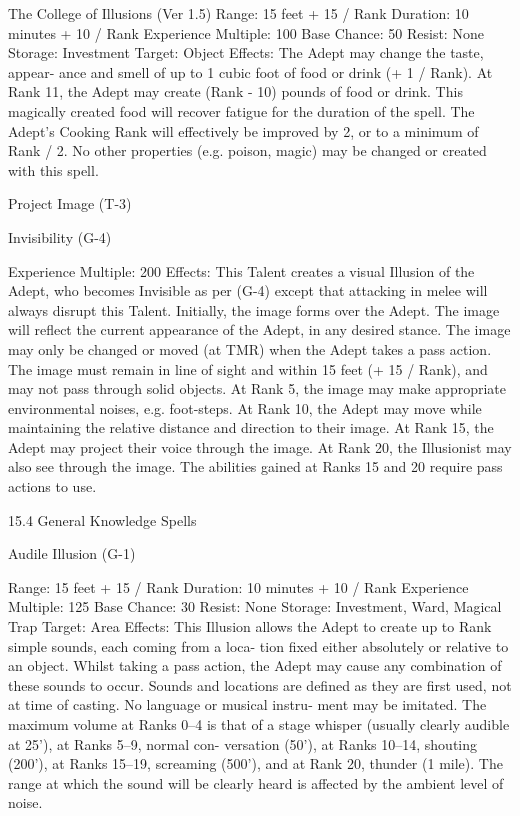 \begin{Chapter}{The College of Illusions (Ver 1.5)}
Range: 15 feet + 15 / Rank 
Duration: 10 minutes + 10 / Rank 
Experience Multiple: 100 
Base Chance: 50%
Resist: None 
Storage: Investment 
Target: Object 
Effects:  The  Adept  may  change  the  taste,  appear-
ance  and  smell  of  up  to  1  cubic  foot  of  food  or 
drink  (+  1  /  Rank).  At  Rank  11,  the  Adept  may 
create  (Rank  -  10)  pounds  of  food  or  drink.  This 
magically created food will recover fatigue for the 
duration  of  the  spell.  The  Adept’s  Cooking  Rank 
will effectively be improved by 2, or to a minimum 
of  Rank  /  2.  No  other  properties  (e.g.  poison, 
magic) may be changed or created with this spell. 

Project Image (T-3) 

Invisibility (G-4) 

Experience Multiple: 200 
Effects: This Talent creates a visual Illusion of the 
Adept, who becomes  Invisible as per (G-4) except 
that  attacking  in  melee  will  always  disrupt  this 
Talent.  Initially,  the  image  forms  over  the  Adept. 
The  image  will  reflect  the  current  appearance  of 
the  Adept,  in  any  desired  stance.  The  image  may 
only  be  changed  or  moved  (at  TMR)  when  the 
Adept takes a pass action. The image must remain 
in  line  of  sight  and  within  15  feet  (+  15  /  Rank), 
and may not pass through solid objects. At Rank 5, 
the  image  may  make  appropriate  environmental 
noises, e.g. foot-steps. At Rank 10, the Adept may 
move  while  maintaining  the  relative  distance  and 
direction  to  their  image.  At  Rank  15,  the  Adept 
may project their voice through the image. At Rank 
20, the Illusionist may also see through the image. 
The  abilities  gained  at  Ranks  15  and  20  require 
pass actions to use. 

15.4 General Knowledge Spells 

Audile Illusion (G-1) 

Range: 15 feet + 15 / Rank 
Duration: 10 minutes + 10 / Rank 
Experience Multiple: 125 
Base Chance: 30%
Resist: None 
Storage: Investment, Ward, Magical Trap 
Target: Area 
Effects: This Illusion allows the Adept to create up 
to  Rank  simple  sounds,  each  coming  from  a  loca-
tion fixed either absolutely or relative to an object. 
Whilst  taking  a  pass  action,  the  Adept  may  cause 
any  combination  of these  sounds  to occur.  Sounds 
and locations are defined as they are first used, not 
at  time  of  casting.  No  language  or  musical  instru-
ment  may  be  imitated.  The  maximum  volume  at 
Ranks  0–4  is  that  of  a  stage  whisper  (usually 
clearly  audible  at  25’),  at  Ranks  5–9,  normal  con-
versation (50’), at Ranks 10–14, shouting (200’), at 
Ranks  15–19,  screaming  (500’),  and  at  Rank  20, 
thunder (1 mile). The range at which the sound will 
be clearly heard is affected by the ambient level of 
noise. 


\end{Chapter}

